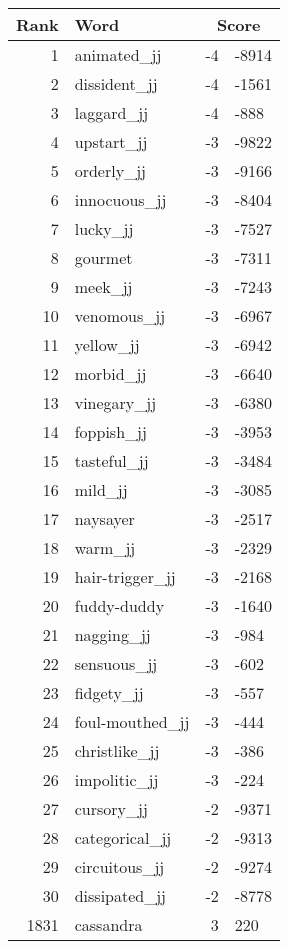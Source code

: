 \begin{longtable}[!htbp]{| rlr@{.}l |}
    \hline
    \textbf{Rank} & \textbf{Word} & \multicolumn{2}{c|}{\textbf{Score}} \\
    \hline
    \endhead
    1 & animated\_jj & -4 & -8914 \\
    2 & dissident\_jj & -4 & -1561 \\
    3 & laggard\_jj & -4 & -888 \\
    4 & upstart\_jj & -3 & -9822 \\
    5 & orderly\_jj & -3 & -9166 \\
    6 & innocuous\_jj & -3 & -8404 \\
    7 & lucky\_jj & -3 & -7527 \\
    8 & gourmet & -3 & -7311 \\
    9 & meek\_jj & -3 & -7243 \\
    10 & venomous\_jj & -3 & -6967 \\
    11 & yellow\_jj & -3 & -6942 \\
    12 & morbid\_jj & -3 & -6640 \\
    13 & vinegary\_jj & -3 & -6380 \\
    14 & foppish\_jj & -3 & -3953 \\
    15 & tasteful\_jj & -3 & -3484 \\
    16 & mild\_jj & -3 & -3085 \\
    17 & naysayer & -3 & -2517 \\
    18 & warm\_jj & -3 & -2329 \\
    19 & hair-trigger\_jj & -3 & -2168 \\
    20 & fuddy-duddy & -3 & -1640 \\
    21 & nagging\_jj & -3 & -984 \\
    22 & sensuous\_jj & -3 & -602 \\
    23 & fidgety\_jj & -3 & -557 \\
    24 & foul-mouthed\_jj & -3 & -444 \\
    25 & christlike\_jj & -3 & -386 \\
    26 & impolitic\_jj & -3 & -224 \\
    27 & cursory\_jj & -2 & -9371 \\
    28 & categorical\_jj & -2 & -9313 \\
    29 & circuitous\_jj & -2 & -9274 \\
    30 & dissipated\_jj & -2 & -8778 \\
    1831 & cassandra & 3 & 220 \\

\end{longtable}
